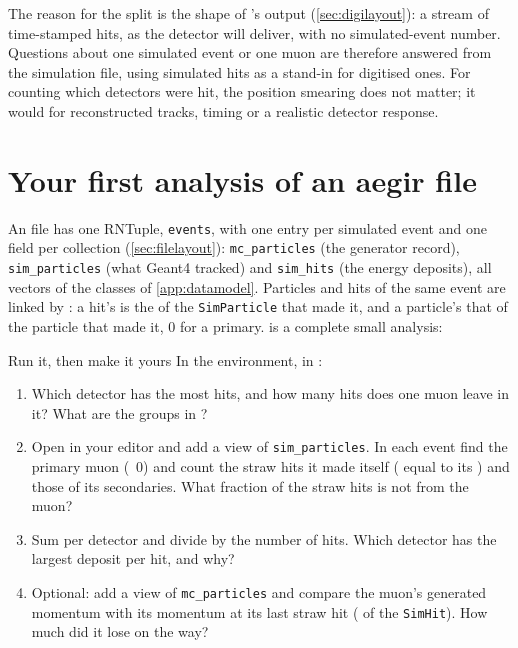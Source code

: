 The reason for the split is the shape of 's output
(\cref{sec:digilayout}): a stream of time-stamped hits, as the detector will
deliver, with no simulated-event number. Questions about one simulated event
or one muon are therefore answered from the simulation file, using simulated
hits as a stand-in for digitised ones. For counting which detectors were hit,
the position smearing does not matter; it would for reconstructed tracks,
timing or a realistic detector response.

\section{Your first analysis of an aegir file}
\label{sec:firstsim}

An  file has one RNTuple, \texttt{events}, with one entry per
simulated event and one field per collection (\cref{sec:filelayout}):
\texttt{mc\_particles} (the generator record), \texttt{sim\_particles} (what
Geant4 tracked) and \texttt{sim\_hits} (the energy deposits), all vectors
of the classes of \cref{app:datamodel}. Particles and hits of the same event
are linked by : a hit's  is the
 of the \texttt{SimParticle} that made it, and a particle's
 that of the particle that made it, 0 for a primary.
 is a complete small analysis:


\begin{exercise}{Run it, then make it yours}
\label{ex:firstsim}
In the  environment, in :
\begin{enumerate}
  \item Which detector has the most hits, and how many hits does one muon
        leave in it? What are the groups in ?
  \item Open  in your editor and add a view of
        \texttt{sim\_particles}. In each event find the primary muon
        (~0) and count the straw hits it made itself
        ( equal to its ) and those of its
        secondaries. What fraction of the straw hits is not from the muon?
  \item Sum  per detector and divide by the number of
        hits. Which detector has the largest deposit per hit, and why?
  \item Optional: add a view of \texttt{mc\_particles} and compare the
        muon's generated momentum with its momentum at its last straw hit
        ( of the \texttt{SimHit}). How much did it lose on
        the way?
\end{enumerate}
\end{exercise}

